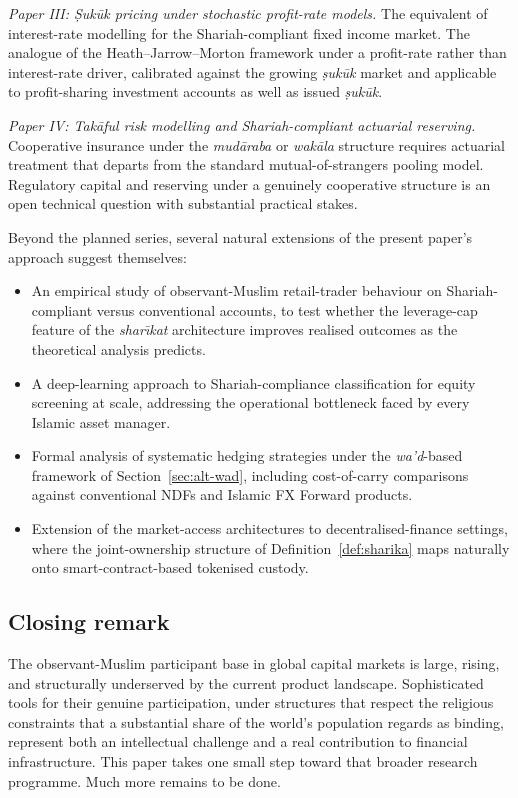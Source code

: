 \documentclass[preprint,12pt,authoryear]{elsarticle}
\theoremstyle{definition}
\begin{document}
\emph{Paper III: \emph{\d{S}uk\={u}k} pricing under stochastic
profit-rate models.} The equivalent of interest-rate modelling
for the Shariah-compliant fixed income market. The analogue of
the Heath--Jarrow--Morton framework under a profit-rate rather
than interest-rate driver, calibrated against the growing
\emph{\d{s}uk\={u}k} market and applicable to profit-sharing
investment accounts as well as issued
\emph{\d{s}uk\={u}k}.

\emph{Paper IV: \emph{Tak\={a}ful} risk modelling and
Shariah-compliant actuarial reserving.} Cooperative insurance
under the \emph{mud\={a}raba} or \emph{wak\={a}la} structure
requires actuarial treatment that departs from the standard
mutual-of-strangers pooling model. Regulatory capital and
reserving under a genuinely cooperative structure is an open
technical question with substantial practical stakes.

Beyond the planned series, several natural extensions of the
present paper's approach suggest themselves:
\begin{itemize}
    \item An empirical study of observant-Muslim retail-trader
    behaviour on Shariah-compliant versus conventional accounts,
    to test whether the leverage-cap feature of the
    \emph{shar\={\i}kat} architecture improves realised
    outcomes as the theoretical analysis predicts.
    \item A deep-learning approach to Shariah-compliance
    classification for equity screening at scale, addressing
    the operational bottleneck faced by every Islamic asset
    manager.
    \item Formal analysis of systematic hedging strategies
    under the \emph{wa'd}-based framework of
    Section~\ref{sec:alt-wad}, including cost-of-carry
    comparisons against conventional NDFs and Islamic FX Forward
    products.
    \item Extension of the market-access architectures to
    decentralised-finance settings, where the joint-ownership
    structure of Definition~\ref{def:sharika} maps naturally
    onto smart-contract-based tokenised custody.
\end{itemize}

\subsection{Closing remark}
\label{sec:concl-closing}

The observant-Muslim participant base in global capital markets
is large, rising, and structurally underserved by the current
product landscape. Sophisticated tools for their genuine
participation, under structures that respect the religious
constraints that a substantial share of the world's population
regards as binding, represent both an intellectual challenge
and a real contribution to financial infrastructure. This paper
takes one small step toward that broader research programme.
Much more remains to be done.
\end{document}
